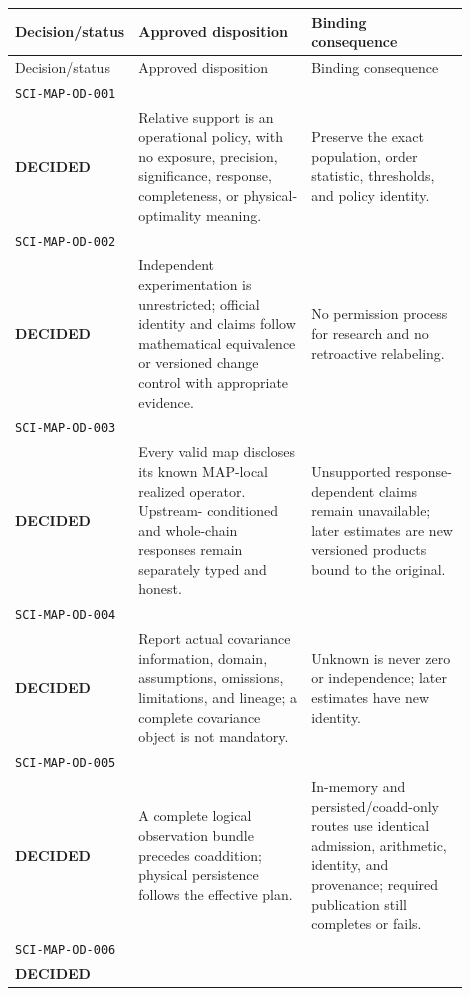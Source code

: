 \begingroup
\small
\setlength{\tabcolsep}{4pt}
\begin{longtable}{L{0.14\linewidth}L{0.40\linewidth}L{0.36\linewidth}}
\toprule
Decision/status & Approved disposition & Binding consequence\\
\midrule
\endfirsthead
\toprule
Decision/status & Approved disposition & Binding consequence\\
\midrule
\endhead
\texttt{SCI-MAP-OD-001}\\\textbf{DECIDED} &
Relative support is an operational policy, with no exposure, precision,
significance, response, completeness, or physical-optimality meaning. &
Preserve the exact population, order statistic, thresholds, and policy identity.\\
\addlinespace[0.35em]
\texttt{SCI-MAP-OD-002}\\\textbf{DECIDED} &
Independent experimentation is unrestricted; official identity and claims
follow mathematical equivalence or versioned change control with appropriate
evidence. &
No permission process for research and no retroactive relabeling.\\
\addlinespace[0.35em]
\texttt{SCI-MAP-OD-003}\\\textbf{DECIDED} &
Every valid map discloses its known MAP-local realized operator.  Upstream-
conditioned and whole-chain responses remain separately typed and honest. &
Unsupported response-dependent claims remain unavailable; later estimates are
new versioned products bound to the original.\\
\addlinespace[0.35em]
\texttt{SCI-MAP-OD-004}\\\textbf{DECIDED} &
Report actual covariance information, domain, assumptions, omissions,
limitations, and lineage; a complete covariance object is not mandatory. &
Unknown is never zero or independence; later estimates have new identity.\\
\addlinespace[0.35em]
\texttt{SCI-MAP-OD-005}\\\textbf{DECIDED} &
A complete logical observation bundle precedes coaddition; physical
persistence follows the effective plan. &
In-memory and persisted/coadd-only routes use identical admission, arithmetic,
identity, and provenance; required publication still completes or fails.\\
\addlinespace[0.35em]
\texttt{SCI-MAP-OD-006}\\\textbf{DECIDED} &

\end{longtable}
